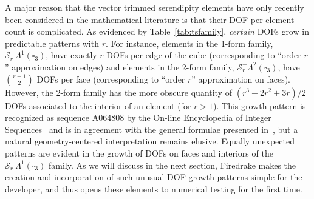 \documentclass[format=acmsmall,screen,timestamp=false,a4paper]{acmart}
\DeclareMathOperator{\Div}{div}
\DeclareMathOperator{\curl}{curl}
\newcommand\akg[1]{\textbf{\textcolor[rgb]{.5,0,1}{[Andrew: #1]}}}
\newcommand{\calS}{\mathcal{S}}
\newcommand{\hcurl}{\ensuremath{{H}(\curl)}\xspace}
\newcommand{\hdiv}{\ensuremath{{H}(\Div)}\xspace}
\begin{document}
	
	A major reason that the vector trimmed serendipity elements have only recently been considered in the mathematical literature is that their DOF per element count is complicated.
	As evidenced by Table~\ref{tab:tsfamily}, \textit{certain} DOFs grow in predictable patterns with $r$.
	For instance, elements in the 1-form family, $\calS_r^-\Lambda^1(\square_3)$, have exactly $r$ DOFs per edge of the cube (corresponding to ``order $r$'' approximation on edges) and elements in the 2-form family, $\calS_r^-\Lambda^2(\square_3)$, have ${\displaystyle {r+1}\choose 2}$ DOFs per face (corresponding to ``order $r$'' approximation on faces).
	However, the 2-form family has the more obscure quantity of $(r^3 - 2r^2 + 3r)/2$ DOFs associated to the interior of an element (for $r>1$).
	This growth pattern is recognized as sequence A064808 by the On-line Encyclopedia of Integer Sequences~\cite{OEIS} and is in agreement with the general formulae presented in~\cite{gillette2019trimmed}, but a natural geometry-centered interpretation remains elusive.
	Equally unexpected patterns are evident in the growth of DOFs on faces and interiors of the $\calS_r^-\Lambda^1(\square_3)$ family.
	As we will discuss in the next section, Firedrake makes the creation and incorporation of such unusual DOF growth patterns simple for the developer, and thus opens these elements to numerical testing for the first time.
	
%	
%
%	
%  
%	
%
%
%  
%  
  
\end{document}
